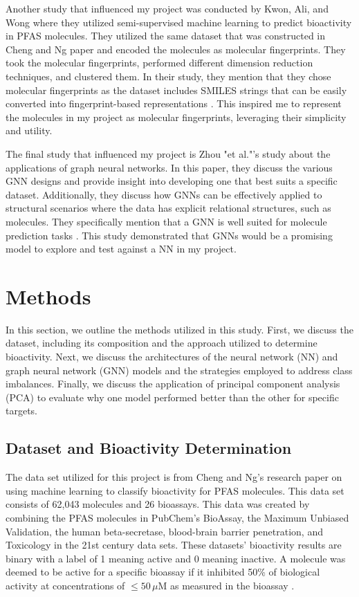 \documentclass[10pt,twocolumn]{article}
\begin{document}
Another study that influenced my project was conducted by Kwon, Ali, and Wong where they utilized semi-supervised machine learning to predict bioactivity in PFAS molecules. They utilized the same dataset that was constructed in Cheng and Ng paper and encoded the molecules as molecular fingerprints. They took the molecular fingerprints, performed different dimension reduction techniques, and clustered them. In their study, they mention that they chose molecular fingerprints as the dataset includes SMILES strings that can be easily converted into fingerprint-based representations \textcite{paper2}. This inspired me to represent the molecules in my project as molecular fingerprints, leveraging their simplicity and utility. 

The final study that influenced my project is Zhou "et al."’s study about the applications of graph neural networks. In this paper, they discuss the various GNN designs and provide insight into developing one that best suits a specific dataset. Additionally, they discuss how GNNs can be effectively applied to structural scenarios where the data has explicit relational structures, such as molecules. They specifically mention that a GNN is well suited for molecule prediction tasks \textcite{paper3}. This study demonstrated that GNNs would be a promising model to explore and test against a NN in my project. 

\section{Methods}

In this section, we outline the methods utilized in this study. First, we discuss the dataset, including its composition and the approach utilized to determine bioactivity. Next, we discuss the architectures of the neural network (NN) and graph neural network (GNN) models and the strategies employed to address class imbalances. Finally, we discuss the application of principal component analysis (PCA) to evaluate why one model performed better than the other for specific targets.

\subsection{Dataset and Bioactivity Determination}

The data set utilized for this project is from Cheng and Ng’s research paper on using machine learning to classify bioactivity for PFAS molecules. This data set consists of 62,043 molecules and 26 bioassays. This data was created by combining the PFAS molecules in PubChem’s BioAssay, the Maximum Unbiased Validation, the human beta-secretase, blood-brain barrier penetration, and Toxicology in the 21st century data sets. These datasets’ bioactivity results are binary with a label of 1 meaning active and 0 meaning inactive. A molecule was deemed to be active for a specific bioassay if it inhibited 50\% of biological activity at concentrations of $ \leq 50 \, \mu\text{M} $ as measured in the bioassay \textcite{paper1}.
\end{document}
